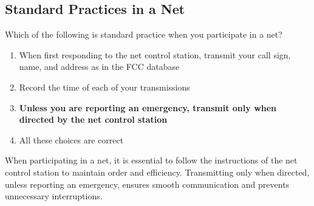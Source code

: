 \subsection{Standard Practices in a Net}
\label{T2C07}

\begin{tcolorbox}[colback=gray!10!white,colframe=black!75!black,title=T2C07]
Which of the following is standard practice when you participate in a net?
\begin{enumerate}[noitemsep]
    \item When first responding to the net control station, transmit your call sign, name, and address as in the FCC database
    \item Record the time of each of your transmissions
    \item \textbf{Unless you are reporting an emergency, transmit only when directed by the net control station}
    \item All these choices are correct
\end{enumerate}
\end{tcolorbox}

When participating in a net, it is essential to follow the instructions of the net control station to maintain order and efficiency. Transmitting only when directed, unless reporting an emergency, ensures smooth communication and prevents unnecessary interruptions.